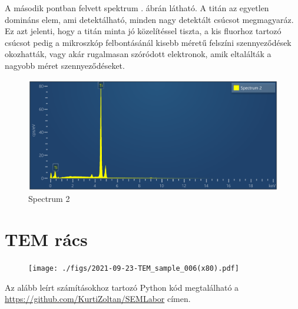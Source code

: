 \documentclass[pdftex,12pt,a4paper]{article}
\begin{document}
			A második pontban felvett spektrum . ábrán látható. A titán az egyetlen domináns elem, ami detektálható, minden nagy detektált csúcsot megmagyaráz. Ez azt jelenti, hogy a titán minta jó közelítéssel tiszta, a kis fluorhoz tartozó csúcsot pedig a mikroszkóp felbontásánál kisebb méretű felszíni szennyeződések okozhatták, vagy akár rugalmasan szóródott elektronok, amik eltalálták a nagyobb méret szennyeződéseket.
			\begin{figure}[H]
				\centering
				\includegraphics[scale=0.7]{./figs/spectrum2.png}
				\caption{Spectrum 2}
				\label{spectrum2}
			\end{figure}
	\section{TEM rács}
		\begin{figure}[H]
			\centering
			\texttt{[image: ./figs/2021-09-23-TEM\_sample\_006(x80).pdf]}
			\caption{}
			\label{temgrid}
		\end{figure}
		Az alább leírt számításokhoz tartozó Python kód megtalálható a \url{https://github.com/KurtiZoltan/SEMLabor} címen.
		
\end{document}
